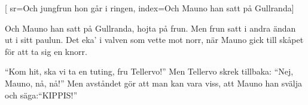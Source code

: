 [ 							
	sr={Och jungfrun hon går i ringen},					
	index={Och Mauno han satt på Gullranda}]		
	
\beginverse*						
Och Mauno han satt på Gullranda,
hojta på frun.
Men frun satt i andra ändan
ut i sitt paulun.
Det eka' i valven som vette mot norr,
när Mauno gick till skåpet
för att ta sig en knorr.
\endverse						

\beginverse				
``Kom hit, ska vi ta en tuting,
fru Tellervo!''
Men Tellervo skrek tillbaka:
``Nej, Mauno, nå, nå!''
Men avståndet gör att man kan vara viss,
att Mauno han svälja och säga:``KIPPIS!''
\endverse				
\endsong		
